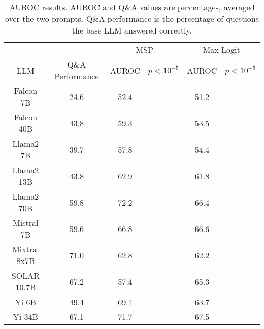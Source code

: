 \begin{table*}
\centering
\begin{tabular}{c|c|c|c|c|c}
& & \multicolumn{2}{c|}{MSP} & \multicolumn{2}{c}{Max Logit} \\ 
LLM & Q\&A Performance & AUROC & $p < 10^{-5}$ & AUROC & $p < 10^{-5}$\\ \hline
Falcon 7B & 24.6 & 52.4 &  & 51.2 & \\
Falcon 40B & 43.8 & 59.3 &  & 53.5 & \\
Llama2 7B & 39.7 & 57.8 &  & 54.4 & \\
Llama2 13B & 43.8 & 62.9 &  & 61.8 & \\
Llama2 70B & 59.8 & 72.2 &  & 66.4 & \\
Mistral 7B & 59.6 & 66.8 &  & 66.6 & \\
Mixtral 8x7B & 71.0 & 62.8 &  & 62.2 & \\
SOLAR 10.7B & 67.2 & 57.4 &  & 65.3 & \\
Yi 6B & 49.4 & 69.1 &  & 63.7 & \\
Yi 34B & 67.1 & 71.7 &  & 67.5 & \\
\hline
\end{tabular}
\caption{AUROC results. AUROC and Q\&A values are percentages, averaged over the two prompts. Q\&A performance is the percentage of questions the base LLM answered correctly.}
\label{tab:auroc}
\end{table*}
